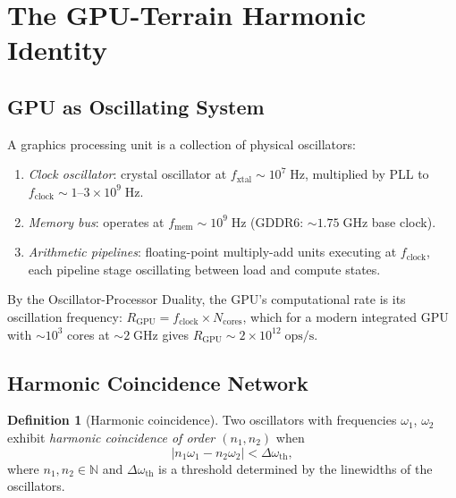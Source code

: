 \documentclass[10pt,twocolumn]{article}
\theoremstyle{definition}
\newtheorem{definition}[theorem]{Definition}
\theoremstyle{remark}
\newcommand{\N}{\mathbb{N}}
\begin{document}
\section{The GPU-Terrain Harmonic Identity}
\label{sec:gpu-terrain}

\subsection{GPU as Oscillating System}\label{sec:gpu_osc}

A graphics processing unit is a collection of physical
oscillators:
\begin{enumerate}[leftmargin=*,itemsep=2pt]
\item \emph{Clock oscillator}: crystal oscillator at
  $f_{\mathrm{xtal}}\sim 10^7\;\mathrm{Hz}$, multiplied by
  PLL to $f_{\mathrm{clock}}\sim 1$--$3\times
  10^9\;\mathrm{Hz}$.
\item \emph{Memory bus}: operates at
  $f_{\mathrm{mem}}\sim 10^9\;\mathrm{Hz}$ (GDDR6:
  $\sim 1.75\;\mathrm{GHz}$ base clock).
\item \emph{Arithmetic pipelines}: floating-point multiply-add
  units executing at $f_{\mathrm{clock}}$, each pipeline stage
  oscillating between load and compute states.
\end{enumerate}

By the Oscillator-Processor Duality, the GPU's computational
rate is its oscillation frequency:
$R_{\mathrm{GPU}}=f_{\mathrm{clock}}\times N_{\mathrm{cores}}$,
which for a modern integrated GPU with $\sim 10^3$ cores at
$\sim 2\;\mathrm{GHz}$ gives $R_{\mathrm{GPU}}\sim
2\times 10^{12}\;\mathrm{ops/s}$.

\subsection{Harmonic Coincidence Network}
\label{sec:harmonic}

\begin{definition}[Harmonic coincidence]\label{def:harmonic}
Two oscillators with frequencies $\omega_1$, $\omega_2$ exhibit
\emph{harmonic coincidence of order $(n_1,n_2)$} when
\begin{equation}\label{eq:coincidence}
  |n_1\omega_1 - n_2\omega_2| < \Delta\omega_{\mathrm{th}},
\end{equation}
where $n_1,n_2\in\N$ and $\Delta\omega_{\mathrm{th}}$ is a
threshold determined by the linewidths of the oscillators.
\end{definition}
\end{document}
